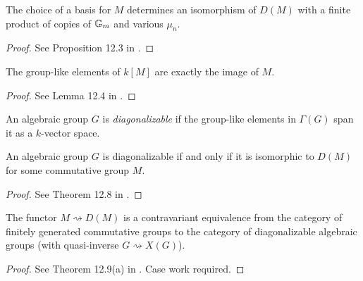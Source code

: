 \begin{proposition}
  \label{DM_struct}
  The choice of a basis for $M$ determines an isomorphism of $D(M)$
  with a finite product of copies of ${\mathbb G_m}$ and various $\mu_n$.
\end{proposition}
\begin{proof}
  See Proposition 12.3 in \cite{Milne_2017}.
\end{proof}

\begin{lemma}
  \label{0-grp-like_in_kM}
  The group-like elements of $k[M]$ are exactly the image of $M$.
\end{lemma}
\begin{proof}
  See Lemma 12.4 in \cite{Milne}.
\end{proof}

\begin{definition}
  \label{diag}
  An algebraic group $G$ is \emph{diagonalizable}
  if the group-like elements in $\Gamma(G)$ span it as a $k$-vector space.
\end{definition}

\begin{theorem}
  \label{diag_iff_D}
  An algebraic group $G$ is diagonalizable
  if and only if it is isomorphic to $D(M)$ for some commutative group $M$.
\end{theorem}
\begin{proof}
  See Theorem 12.8 in \cite{Milne_2017}.
\end{proof}

\begin{theorem}
  \label{congr_fggrp_diag}
  The functor $M\rightsquigarrow D(M)$ is a contravariant equivalence
  from the category of finitely generated commutative groups to the category of
  diagonalizable algebraic groups (with quasi-inverse $G \rightsquigarrow X(G)$).
\end{theorem}
\begin{proof}
  See Theorem 12.9(a) in \cite{Milne_2017}. Case work required.
\end{proof}
